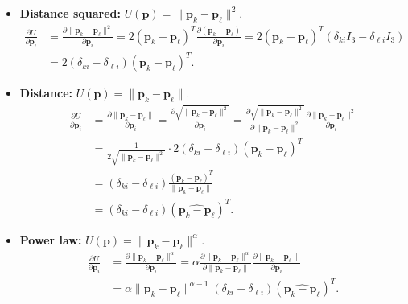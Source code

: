 \documentclass[10pt]{article}
\newcommand{\ve}[1]{\mathbf{#1}}
\begin{document}
  \begin{itemize}
    \item {\bf Distance squared:} $U(\ve{p}) = \| \ve{p}_k - \ve{p}_\ell \|^2$.
    \begin{align*}
      \frac{\partial U}{\partial \ve{p}_i} 
      &= \frac{\partial \| \ve{p}_k - \ve{p}_\ell \|^2}{\partial \ve{p}_i}
      = 2 (\ve{p}_k - \ve{p}_\ell)^T \frac{\partial (\ve{p}_k - \ve{p}_\ell)}{\partial \ve{p}_i}
      = 2 (\ve{p}_k - \ve{p}_\ell)^T (\delta_{ki}I_3 - \delta_{\ell i} I_3)\\
      &= 2 (\delta_{ki} - \delta_{\ell i})  (\ve{p}_k - \ve{p}_\ell)^T.
    \end{align*}

    \item {\bf Distance:} $U(\ve{p}) = \| \ve{p}_k - \ve{p}_\ell \|$.
    \begin{align*}
      \frac{\partial U}{\partial \ve{p}_i} 
      &= \frac{\partial \| \ve{p}_k - \ve{p}_\ell \|}{\partial \ve{p}_i}
      = \frac{\partial \sqrt{\| \ve{p}_k - \ve{p}_\ell \|^2}}{\partial \ve{p}_i}
      = \frac{\partial \sqrt{\| \ve{p}_k - \ve{p}_\ell \|^2}}{\partial \| \ve{p}_k - \ve{p}_\ell \|^2} \frac{\partial \| \ve{p}_k - \ve{p}_\ell \|^2}{\partial \ve{p}_i}\\
      &= \frac{1}{2 \sqrt{\| \ve{p}_k - \ve{p}_\ell \|^2} } \cdot 2 (\delta_{ki} - \delta_{\ell i})  (\ve{p}_k - \ve{p}_\ell)^T\\
      &= (\delta_{ki} - \delta_{\ell i}) \frac{(\ve{p}_k - \ve{p}_\ell)^T}{\| \ve{p}_k - \ve{p}_\ell \| }\\
      &= (\delta_{ki} - \delta_{\ell i}) (\widehat{\ve{p}_k - \ve{p}_\ell})^T.
    \end{align*}

    \item {\bf Power law:} $U(\ve{p}) = \| \ve{p}_k - \ve{p}_\ell \|^\alpha$.
    \begin{align*}
      \frac{\partial U}{\partial \ve{p}_i} 
      &= \frac{\partial \| \ve{p}_k - \ve{p}_\ell \|^\alpha}{\partial \ve{p}_i}
      = \alpha \frac{\partial \| \ve{p}_k - \ve{p}_\ell \|^\alpha}{\partial \| \ve{p}_k - \ve{p}_\ell \|} \frac{\partial \| \ve{p}_k - \ve{p}_\ell \|}{\partial \ve{p}_i}\\
      &= \alpha \| \ve{p}_k - \ve{p}_\ell \|^{\alpha-1} (\delta_{ki} - \delta_{\ell i}) (\widehat{\ve{p}_k - \ve{p}_\ell})^T.
    \end{align*}


\end{itemize}
\end{document}
